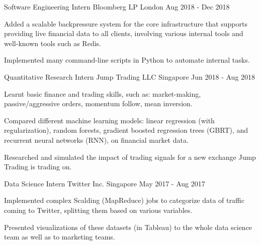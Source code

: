 

\begin{cventries}

  \cventry
  {Software Engineering Intern} %
  {Bloomberg LP} %
  {London} %
  {Aug 2018 - Dec 2018} %
  {
    \begin{cvitems} %
    \item {Added a scalable backpressure system for the core infrastructure that supports providing live financial data to all clients, involving various internal tools and well-known tools such as Redis.}
    \item {Implemented many command-line scripts in Python to automate internal tasks.}
    \end{cvitems}
  }

  \cventry
  {Quantitative Research Intern} %
  {Jump Trading LLC} %
  {Singapore} %
  {Jun 2018 - Aug 2018} %
  {
    \begin{cvitems} %
    \item {Learnt basic finance and trading skills, such as: market-making, passive/aggressive orders, momentum follow, mean inversion.}
    \item {Compared different machine learning models: linear regression (with regularization), random forests, gradient boosted regression trees (GBRT), and recurrent neural networks (RNN), on financial market data.}
    \item {Researched and simulated the impact of trading signals for a new exchange Jump Trading is trading on.}
    \end{cvitems}
  }

  \cventry
  {Data Science Intern} %
  {Twitter Inc.} %
  {Singapore} %
  {May 2017 - Aug 2017} %
  {
    \begin{cvitems} %
    \item {Implemented complex Scalding (MapReduce) jobs to categorize data of traffic coming to Twitter, splitting them based on various variables.}
    \item {Presented visualizations of these datasets (in Tableau) to the whole data science team as well as to marketing teams.}
    \end{cvitems}
  }


\end{cventries}
